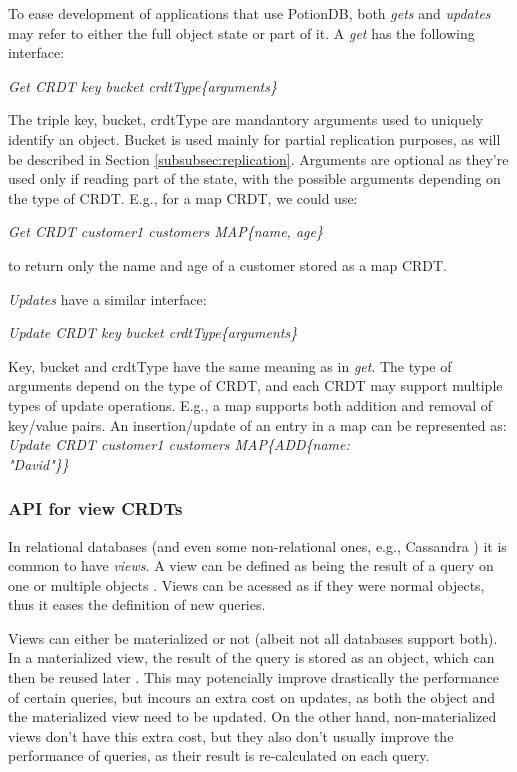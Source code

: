 \documentclass{vldb}
\newcommand{\emphvspace}{0.5\baselineskip}
\newcommand{\lineemph}[1]{\vspace{\emphvspace}\hspace{2em}\emph{#1}\vspace{\emphvspace}}
\begin{document}
To ease development of applications that use PotionDB, both \emph{gets} and \emph{updates} may refer to either the full object state or part of it.
A \emph{get} has the following interface: %

\lineemph{Get CRDT key bucket crdtType\{arguments\}}

The triple key, bucket, crdtType are mandantory arguments used to uniquely identify an object.
Bucket is used mainly for partial replication purposes, as will be described in Section \ref{subsubsec:replication}. 
Arguments are optional as they're used only if reading part of the state, with the possible arguments depending on the type of CRDT. 
E.g., for a map CRDT, we could use: 

\lineemph{Get CRDT customer1 customers MAP\{name, age\}}

to return only the name and age of a customer stored as a map CRDT.

\emph{Updates} have a similar interface:

\lineemph{Update CRDT key bucket crdtType\{arguments\}}

Key, bucket and crdtType have the same meaning as in \emph{get}.
The type of arguments depend on the type of CRDT, and each CRDT may support multiple types of update operations. 
E.g., a map supports both addition and removal of key/value pairs.
An insertion/update of an entry in a map can be represented as: \\

\lineemph{Update CRDT customer1 customers MAP\{ADD\{name: \\"David"\}\}}

\subsubsection{API for view CRDTs}
\label{subsubsec:APIVew}

In relational databases (and even some non-relational ones, e.g., Cassandra \cite{???}) it is common to have \emph{views}. 
A view can be defined as being the result of a query on one or multiple objects \cite{???}.
Views can be acessed as if they were normal objects, thus it eases the definition of new queries.

Views can either be materialized or not (albeit not all databases support both). %
In a materialized view, the result of the query is stored as an object, which can then be reused later \cite{???}.
This may potencially improve drastically the performance of certain queries, but incours an extra cost on updates, as both the object and the materialized view need to be updated.
On the other hand, non-materialized views don't have this extra cost, but they also don't usually improve the performance of queries, as their result is re-calculated on each query.
\end{document}
